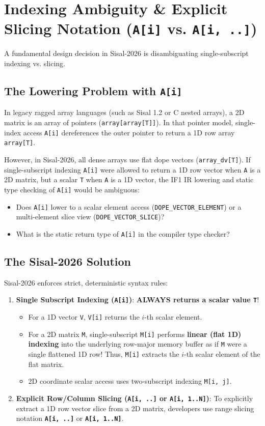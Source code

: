 \section{Indexing Ambiguity \& Explicit Slicing Notation (\texttt{A[i]} vs. \texttt{A[i, ..]})}
A fundamental design decision in Sisal-2026 is disambiguating single-subscript indexing vs. slicing.

\subsection{The Lowering Problem with \texttt{A[i]}}
In legacy ragged array languages (such as Sisal 1.2 or C nested arrays), a 2D matrix is an array of pointers (\texttt{array[array[T]]}). In that pointer model, single-index access \texttt{A[i]} dereferences the outer pointer to return a 1D row array \texttt{array[T]}.

However, in Sisal-2026, all dense arrays use flat dope vectors (\texttt{array\_dv[T]}). If single-subscript indexing \texttt{A[i]} were allowed to return a 1D row vector when \texttt{A} is a 2D matrix, but a scalar \texttt{T} when \texttt{A} is a 1D vector, the IF1 IR lowering and static type checking of \texttt{A[i]} would be ambiguous:
\begin{itemize}
    \item Does \texttt{A[i]} lower to a scalar element access (\texttt{DOPE\_VECTOR\_ELEMENT}) or a multi-element slice view (\texttt{DOPE\_VECTOR\_SLICE})?
    \item What is the static return type of \texttt{A[i]} in the compiler type checker?
\end{itemize}

\subsection{The Sisal-2026 Solution}
Sisal-2026 enforces strict, deterministic syntax rules:
\begin{enumerate}
    \item \textbf{Single Subscript Indexing (\texttt{A[i]})}: \textbf{ALWAYS returns a scalar value \texttt{T}}!
    \begin{itemize}
        \item For a 1D vector \texttt{V}, \texttt{V[i]} returns the $i$-th scalar element.
        \item For a 2D matrix \texttt{M}, single-subscript \texttt{M[i]} performs \textbf{linear (flat 1D) indexing} into the underlying row-major memory buffer as if \texttt{M} were a single flattened 1D row! Thus, \texttt{M[i]} extracts the $i$-th scalar element of the flat matrix.
        \item 2D coordinate scalar access uses two-subscript indexing \texttt{M[i, j]}.
    \end{itemize}
    \item \textbf{Explicit Row/Column Slicing (\texttt{A[i, ..]} or \texttt{A[i, 1..N]})}: To explicitly extract a 1D row vector slice from a 2D matrix, developers use range slicing notation \textbf{\texttt{A[i, ..]}} or \textbf{\texttt{A[i, 1..N]}}.
\end{enumerate}

